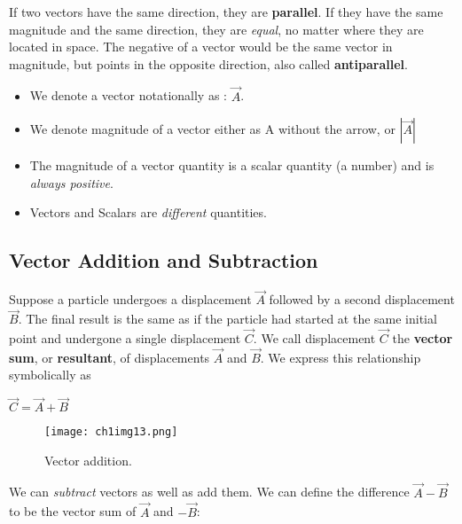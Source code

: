 If two vectors have the same direction, they are \textbf{parallel}. If they have the same magnitude and the same direction, they are \textit{equal}, no matter where they are located in space. The negative of a vector would be the same vector in magnitude, but points in the opposite direction, also called \textbf{antiparallel}.

\begin{tipbox}
\begin{itemize}
\item We denote a vector notationally as : $\overrightarrow{A}$.
\item We denote magnitude of a vector either as A without the arrow, or $\left | \overrightarrow{A} \right |$
\item The magnitude of a vector quantity is a scalar quantity (a number) and is \textit{always positive}.
\item Vectors and Scalars are \textit{different} quantities.
\end{itemize}
\end{tipbox}

\subsection*{Vector Addition and Subtraction}
Suppose a particle undergoes a displacement $\overrightarrow{A}$ followed by a second displacement $\overrightarrow{B}$. The final result is the same as if the particle had started at the same initial point and undergone a single displacement $\overrightarrow{C}$. We call displacement $\overrightarrow{C}$ the \textbf{vector sum}, or \textbf{resultant}, of displacements $\overrightarrow{A}$ and $\overrightarrow{B}$. We express this relationship symbolically as\\

\begin{center}
$\overrightarrow{C} = \overrightarrow{A} + \overrightarrow{B}$
\end{center}

\begin{figure}[htbp]
 \centering
\texttt{[image: ch1img13.png]}
  \caption{Vector addition.}
  \label{fig:ch1img13}
\end{figure}

We can \textit{subtract} vectors as well as add them. We can define the difference $\overrightarrow{A} - \overrightarrow{B}$ to be the vector sum of $\overrightarrow{A}$ and $-\overrightarrow{B}$:\newline


